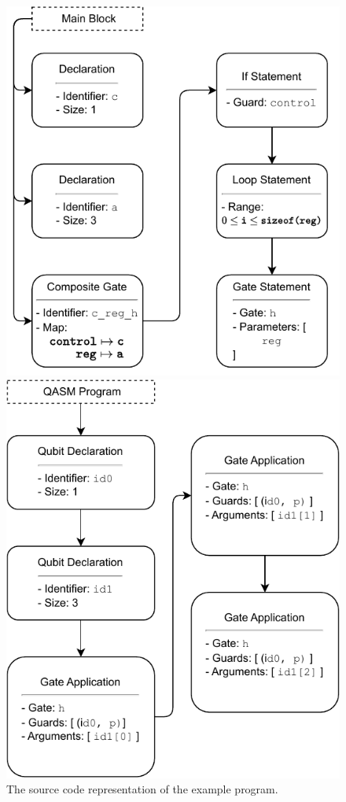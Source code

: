 \begin{figure}
    \centering     
    \begin{minipage}{.45\textwidth}
        \includegraphics[width=\textwidth]{../figures/codeGen_sourceCode_example.pdf}
        \caption{The source code representation of the example program.}
        \label{fig:codeGen_sourceCodeRep_example}
    \end{minipage}
    \hfill
    \begin{minipage}{.45\textwidth}
        \includegraphics[width=\textwidth]{../figures/codeGen_targetCode_example.pdf}

\end{minipage}
\end{figure}
